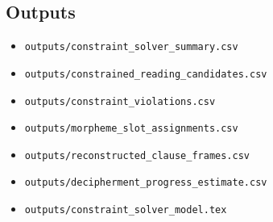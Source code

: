 \subsection{Outputs}

\begin{itemize}
  \item \texttt{outputs/constraint\_solver\_summary.csv}
  \item \texttt{outputs/constrained\_reading\_candidates.csv}
  \item \texttt{outputs/constraint\_violations.csv}
  \item \texttt{outputs/morpheme\_slot\_assignments.csv}
  \item \texttt{outputs/reconstructed\_clause\_frames.csv}
  \item \texttt{outputs/decipherment\_progress\_estimate.csv}
  \item \texttt{outputs/constraint\_solver\_model.tex}
\end{itemize}
